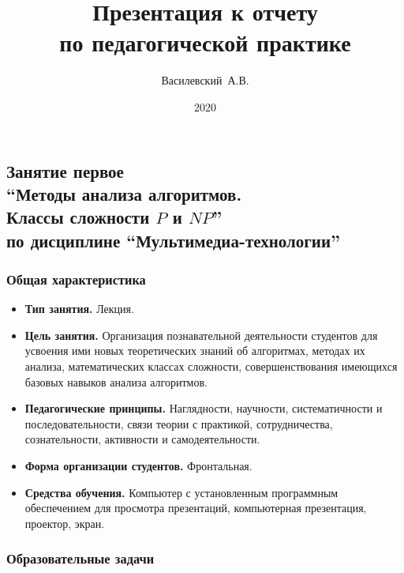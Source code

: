 \documentclass[compress, 9pt]{beamer}
\title{Презентация к отчету\\ по педагогической практике}
\author{Василевский~А.В.}
\institute[ННГУ]{Нижегородский университет им. Н.И.~Лобачевского}
\date{2020}
\begin{document}
    \frame[plain]{\titlepage}

    \begin{refsection}
    \section[Занятие первое]{Занятие первое\\
        {\LARGE{\textbf{\enquote{Методы анализа алгоритмов.\\ Классы сложности $P$ и $NP$}}}}\\
        по дисциплине \enquote{Мультимедиа-технологии}}

    \begin{frame}\frametitle{Общая характеристика}

        \begin{itemize}\justifying
            \item \textbf{Тип занятия.} Лекция.

            \item \textbf{Цель занятия.} Организация познавательной деятельности студентов для усвоения ими новых теоретических знаний об алгоритмах, методах их анализа, математических классах сложности, совершенствования имеющихся базовых навыков анализа алгоритмов.

            \item \textbf{Педагогические принципы.} Наглядности, научности, систематичности и последовательности, связи теории с практикой, сотрудничества, сознательности, активности и самодеятельности.

            \item \textbf{Форма организации студентов.} Фронтальная.

            \item \textbf{Средства обучения.} Компьютер с установленным программным обеспечением для просмотра презентаций, компьютерная презентация, проектор, экран.
        \end{itemize}

    \end{frame}

    \begin{frame}\frametitle{Образовательные задачи}


\end{frame}
\end{refsection}
\end{document}
